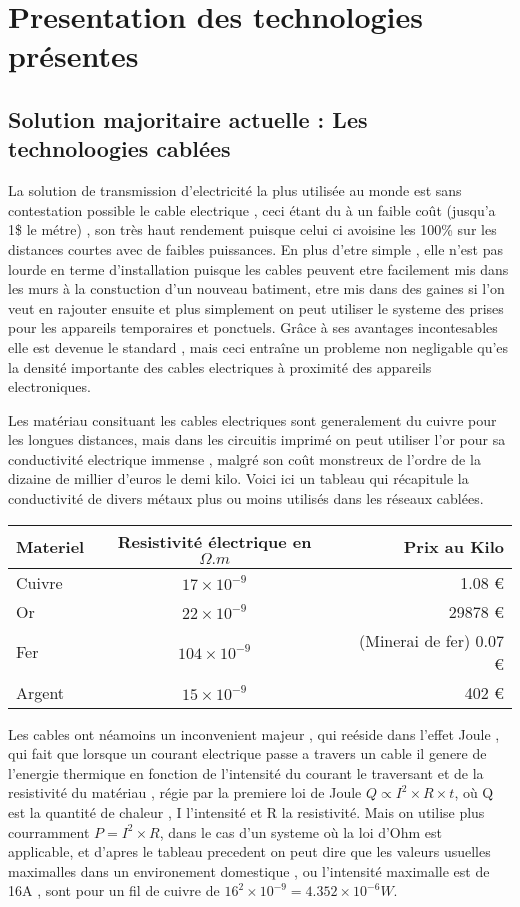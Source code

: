 \documentclass[11pt]{report}
\begin{document}
\section{Presentation des technologies présentes}
\subsection{Solution majoritaire actuelle : Les technoloogies cablées}
	La solution de transmission d'electricité la plus utilisée au monde est sans contestation possible le cable electrique , ceci étant du à un faible coût (jusqu'a 1\$ le métre) , son très haut rendement puisque celui ci avoisine les 100\% sur les distances courtes avec de faibles puissances. En plus d'etre simple , elle n'est pas lourde en terme d'installation puisque les cables peuvent etre facilement mis dans les murs à la constuction d'un nouveau batiment, etre mis dans des gaines si l'on veut en rajouter ensuite et plus simplement on peut utiliser le systeme des prises pour les appareils temporaires et ponctuels. Grâce à ses avantages incontesables elle est devenue le standard , mais ceci entraîne un probleme non negligable qu'es la densité importante des cables electriques à proximité des appareils electroniques.
	
	Les matériau consituant les cables electriques sont generalement du cuivre pour les longues distances, mais dans les circuitis imprimé on peut utiliser l'or pour sa conductivité electrique immense , malgré son coût monstreux de l'ordre de la dizaine de millier d'euros le demi kilo. Voici ici un tableau qui récapitule la conductivité de divers métaux plus ou moins utilisés dans les réseaux cablées.

\begin{center}
\begin{tabular}{| l | c | r |}
	\hline
	Materiel & Resistivité électrique en \( \Omega .m \) & Prix au Kilo \\
	\hline
	Cuivre & \(17 \times 10^{-9} \) & 1.08 \euro{}  \\
	Or & \(22 \times 10^{-9} \) & 29878 \euro{}  \\
	Fer & \(104 \times 10^{-9}\) & (Minerai de fer) 0.07 \euro{}  \\
	Argent & \(15 \times 10^{-9}\) & 402 \euro{}  \\
	\hline
\end{tabular}
\end{center}

	Les cables ont néamoins un inconvenient majeur , qui reéside dans l'effet Joule , qui fait que lorsque un courant electrique passe a travers un cable il genere de l'energie thermique en fonction de l'intensité du courant le traversant et de la resistivité du matériau , régie par la premiere loi de Joule \( Q \propto I^2 \times R \times t \), où Q est la quantité de chaleur , I l'intensité et R la resistivité. Mais on utilise plus courramment \( P = I^2 \times R \), dans le cas d'un systeme où la loi d'Ohm est applicable, et d'apres le tableau precedent on peut dire que les valeurs usuelles maximalles dans un environement domestique , ou l'intensité maximalle est de 16A , sont pour un fil de cuivre de \( 16^2 \times 10^{-9} = 4.352 \times 10^{-6}W \).
\end{document}

